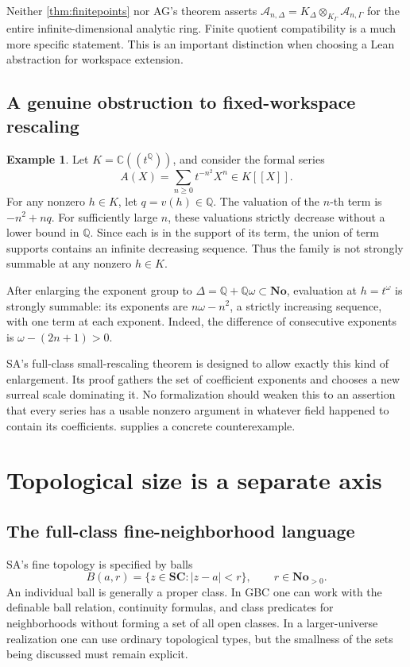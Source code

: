 \documentclass[11pt,letterpaper]{article}
\theoremstyle{definition}
\newtheorem{example}[theorem]{Example}
\theoremstyle{remark}
\newcommand{\No}{\mathbf{No}}
\newcommand{\SC}{\mathbf{SC}}
\newcommand{\C}{\mathbb C}
\newcommand{\Q}{\mathbb Q}
\newcommand{\A}{\mathscr A}
\numberwithin{equation}{section}
\begin{document}
Neither \cref{thm:finitepoints} nor AG's theorem asserts
\(\A_{n,\Delta}=K_\Delta\otimes_{K_\Gamma}\A_{n,\Gamma}\)
for the entire infinite-dimensional analytic ring. Finite quotient compatibility is a much more specific statement. This is an important distinction when choosing a Lean abstraction for workspace extension.

\subsection{A genuine obstruction to fixed-workspace rescaling}
\begin{example}\label{ex:rescaling}
Let \(K=\C((t^\Q))\), and consider the formal series
\[
 A(X)=\sum_{n\ge0}t^{-n^2}X^n\in K[[X]].
\]
For any nonzero \(h\in K\), let \(q=v(h)\in\Q\). The valuation of the \(n\)-th term is \(-n^2+nq\). For sufficiently large \(n\), these valuations strictly decrease without a lower bound in \(\Q\). Since each is in the support of its term, the union of term supports contains an infinite decreasing sequence. Thus the family is not strongly summable at any nonzero \(h\in K\).

After enlarging the exponent group to \(\Delta=\Q+\Q\omega\subset\No\), evaluation at \(h=t^\omega\) is strongly summable: its exponents are \(n\omega-n^2\), a strictly increasing sequence, with one term at each exponent. Indeed, the difference of consecutive exponents is \(\omega-(2n+1)>0\).
\end{example}

SA's full-class small-rescaling theorem is designed to allow exactly this kind of enlargement. Its proof gathers the set of coefficient exponents and chooses a new surreal scale dominating it. No formalization should weaken this to an assertion that every series has a usable nonzero argument in whatever field happened to contain its coefficients.  supplies a concrete counterexample.

\section{Topological size is a separate axis}\label{sec:topology}

\subsection{The full-class fine-neighborhood language}
SA's fine topology is specified by balls
\[
 B(a,r)=\{z\in\SC:|z-a|<r\},\qquad r\in\No_{>0}.
\]
An individual ball is generally a proper class. In GBC one can work with the definable ball relation, continuity formulas, and class predicates for neighborhoods without forming a set of all open classes. In a larger-universe realization one can use ordinary topological types, but the smallness of the sets being discussed must remain explicit.
\end{document}
